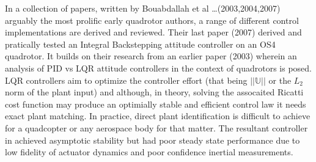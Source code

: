 \par
In a collection of papers, written by Bouabdallah et al \ldots (2003,2004,2007) arguably the most prolific early quadrotor authors, a range of different control implementations are derived and reviewed. Their last paper (2007)\cite{fullquadcoptercontrol} derived and pratically tested an Integral Backstepping attitude controller on an OS4 quadrotor. It builds on their research from an earlier paper (2003)\cite{pidlqr} wherein an analysis of PID vs LQR attitude controllers in the context of quadrotors is posed. LQR controllers aim to optimize the controller effort (that being $||\mathbb{U}||$ or the $L_2$ norm of the plant input) and although, in theory, solving the assocaited Ricatti cost function may produce an optimially stable and efficient control law it needs exact plant matching. In practice, direct plant identification is difficult to achieve for a quadcopter or any aerospace body for that matter. The resultant controller in \cite{pidlqr} achieved asymptotic stability but had poor steady state performance due to low fidelity of actuator dynamics and poor confidence inertial measurements.
\par
